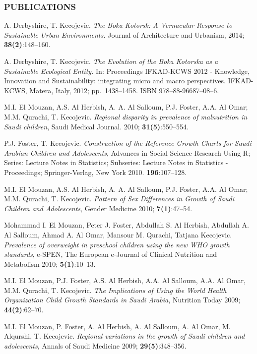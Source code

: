 \documentclass[
]{article}
\begin{document}
\hypertarget{publications}{%
\subsubsection{PUBLICATIONS}\label{publications}}

A. Derbyshire, T. Kecojevic. \emph{The Boka Kotorsk: A Vernacular
Response to Sustainable Urban Environments.} Journal of Architecture and
Urbanism, 2014; \textbf{38(2)}:148--160.

A. Derbyshire, T. Kecojevic. \emph{The Evolution of the Boka Kotorska as
a Sustainable Ecological Entity.} In: Proceedings IFKAD-KCWS 2012 -
Knowledge, Innovation and Sustainability: integrating micro and macro
perspectives. IFKAD-KCWS, Matera, Italy, 2012; pp.~1438--1458. ISBN
978--88-96687--08--6.

M.I. El Mouzan, A.S. Al Herbish, A. A. Al Salloum, P.J. Foster, A.A. Al
Omar; M.M. Qurachi, T. Kecojevic. \emph{Regional disparity in prevalence
of malnutrition in Saudi children}, Saudi Medical Journal. 2010;
\textbf{31(5)}:550--554.

P.J. Foster, T. Kecojevic. \emph{Construction of the Reference Growth
Charts for Saudi Arabian Children and Adolescents}, Advances in Social
Science Research Using R; Series: Lecture Notes in Statistics;
Subseries: Lecture Notes in Statistics - Proceedings; Springer-Verlag,
New York 2010. \textbf{196}:107--128.

M.I. El Mouzan, A.S. Al Herbish, A. A. Al Salloum, P.J. Foster, A.A. Al
Omar; M.M. Qurachi, T. Kecojevic. \emph{Pattern of Sex Differences in
Growth of Saudi Children and Adolescents}, Gender Medicine 2010;
\textbf{7(1)}:47--54.

Mohammad I. El Mouzan, Peter J. Foster, Abdullah S. Al Herbish, Abdullah
A. Al Salloum, Ahmad A. Al Omar, Mansour M. Qurachi, Tatjana Kecojevic.
\emph{Prevalence of overweight in preschool children using the new WHO
growth standards}, e-SPEN, The European e-Journal of Clinical Nutrition
and Metabolism 2010; \textbf{5(1)}:10--13.

M.I. El Mouzan, P.J. Foster, A.S. Al Herbish, A.A. Al Salloum, A.A. Al
Omar, M.M. Qurachi, T. Kecojevic. \emph{The Implications of Using the
World Health Organization Child Growth Standards in Saudi Arabia},
Nutrition Today 2009; \textbf{44(2)}:62--70.

M.I. El Mouzan, P. Foster, A. Al Herbish, A. Al Salloum, A. Al Omar, M.
Alqurshi, T. Kecojevic. \emph{Regional variations in the growth of Saudi
children and adolescents}, Annals of Saudi Medicine 2009;
\textbf{29(5)}:348--356.
\end{document}
